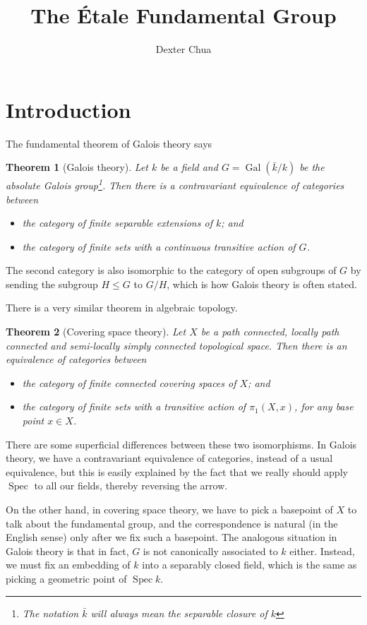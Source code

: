 \documentclass{shortart}
\title{The \'Etale Fundamental Group}
\author{Dexter Chua}
\newtheorem*{thm}{Theorem}
\theoremstyle{definition}
\DeclareMathOperator\Gal{Gal}
\DeclareMathOperator\Spec{Spec}
\begin{document}
\section{Introduction}
The fundamental theorem of Galois theory says
\begin{thm}[Galois theory]
  Let $k$ be a field and $G = \Gal(\bar{k}/k)$ be the absolute Galois group\footnote{The notation $\bar{k}$ will always mean the \emph{separable} closure of $k$}. Then there is a contravariant equivalence of categories between
  \begin{itemize}
    \item the category of finite separable extensions of $k$; and
    \item the category of finite sets with a continuous transitive action of $G$.\fakeqed
  \end{itemize}
\end{thm}
The second category is also isomorphic to the category of open subgroups of $G$ by sending the subgroup $H \leq G$ to $G/H$, which is how Galois theory is often stated.

There is a very similar theorem in algebraic topology.
\begin{thm}[Covering space theory]
  Let $X$ be a path connected, locally path connected and semi-locally simply connected topological space. Then there is an equivalence of categories between
  \begin{itemize}
    \item the category of finite connected covering spaces of $X$; and
    \item the category of finite sets with a transitive action of $\pi_1(X, x)$, for any base point $x \in X$.\fakeqed
  \end{itemize}
\end{thm}
There are some superficial differences between these two isomorphisms. In Galois theory, we have a contravariant equivalence of categories, instead of a usual equivalence, but this is easily explained by the fact that we really should apply $\Spec$ to all our fields, thereby reversing the arrow.

On the other hand, in covering space theory, we have to pick a basepoint of $X$ to talk about the fundamental group, and the correspondence is natural (in the English sense) only after we fix such a basepoint. The analogous situation in Galois theory is that in fact, $G$ is not canonically associated to $k$ either. Instead, we must fix an embedding of $k$ into a separably closed field, which is the same as picking a geometric point of $\Spec k$.
\end{document}
